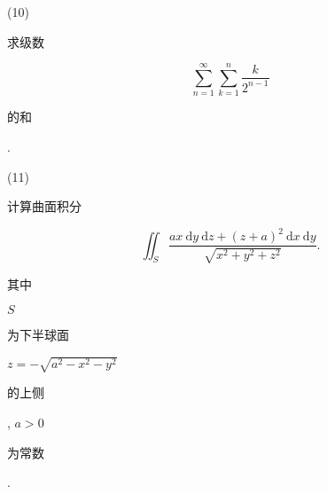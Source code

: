 \documentclass[10pt]{article}
\begin{document}
(10) \begin{CJK}{UTF8}{mj}求级数\end{CJK}
$$
\sum_{n=1}^{\infty} \sum_{k=1}^{n} \frac{k}{2^{n-1}}
$$
\begin{CJK}{UTF8}{mj}的和\end{CJK}.

(11) \begin{CJK}{UTF8}{mj}计算曲面积分\end{CJK}
$$
\iint_{S} \frac{a x \mathrm{~d} y \mathrm{~d} z+(z+a)^{2} \mathrm{~d} x \mathrm{~d} y}{\sqrt{x^{2}+y^{2}+z^{2}}} .
$$
\begin{CJK}{UTF8}{mj}其中\end{CJK} $S$ \begin{CJK}{UTF8}{mj}为下半球面\end{CJK} $z=-\sqrt{a^{2}-x^{2}-y^{2}}$ \begin{CJK}{UTF8}{mj}的上侧\end{CJK}, $a>0$ \begin{CJK}{UTF8}{mj}为常数\end{CJK}.
\end{document}
